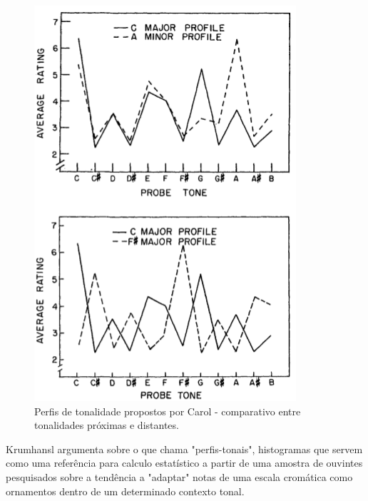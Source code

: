 \documentclass[
	12pt,				%
	openright,			%
	twoside,			%
	a4paper,			%
	english,			%
	french,				%
	spanish,			%
	brazil				%
	]{abntex2}
\begin{document}
\begin{figure}[!h]
	\caption{\label{fig_grafico}Perfis de tonalidade propostos por Carol  - comparativo entre tonalidades próximas e distantes. }
	\begin{center}
	    \includegraphics[scale=0.63]{CBMS/probeones_krumhansl_p36.png}
	\end{center}
\end{figure}

Krumhansl argumenta sobre o que chama "perfis-tonais", histogramas que servem como uma referência para calculo estatístico a partir de uma amostra de ouvintes pesquisados sobre a tendência a "adaptar"\cite[p.173]{temperley2001cognition} notas de uma escala cromática como ornamentos dentro de um determinado contexto tonal.
\end{document}

